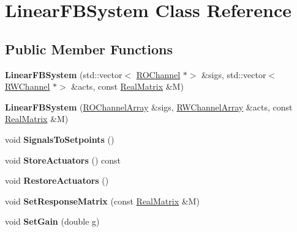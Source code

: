 \hypertarget{classLinearFBSystem}{}\section{Linear\+F\+B\+System Class Reference}
\label{classLinearFBSystem}
\subsection*{Public Member Functions}
\begin{DoxyCompactItemize}
\item 
\mbox{\label{classLinearFBSystem_a61e823fce2a88857f47ac68df6d3d3f1}} 
{\bfseries Linear\+F\+B\+System} (std\+::vector$<$ \hyperlink{classROChannel}{R\+O\+Channel} $\ast$$>$ \&sigs, std\+::vector$<$ \hyperlink{classRWChannel}{R\+W\+Channel} $\ast$$>$ \&acts, const \hyperlink{classTLAS_1_1Matrix}{Real\+Matrix} \&M)
\item 
\mbox{\label{classLinearFBSystem_aea0fb2b61de072efb6f20ce692f8115a}} 
{\bfseries Linear\+F\+B\+System} (\hyperlink{classROChannelArray}{R\+O\+Channel\+Array} \&sigs, \hyperlink{classRWChannelArray}{R\+W\+Channel\+Array} \&acts, const \hyperlink{classTLAS_1_1Matrix}{Real\+Matrix} \&M)
\item 
\mbox{\label{classLinearFBSystem_acb3b2e6a880de066f4ee37156e20447f}} 
void {\bfseries Signals\+To\+Setpoints} ()
\item 
\mbox{\label{classLinearFBSystem_ac9a6be5d7594c52d625ba764a265460a}} 
void {\bfseries Store\+Actuators} () const
\item 
\mbox{\label{classLinearFBSystem_a5eed47c6292fc1c4e8fb955da32b4aa9}} 
void {\bfseries Restore\+Actuators} ()
\item 
\mbox{\label{classLinearFBSystem_adb6b1fdf6cb4542d3030c21d1d48fd5d}} 
void {\bfseries Set\+Response\+Matrix} (const \hyperlink{classTLAS_1_1Matrix}{Real\+Matrix} \&M)
\item 
\mbox{\label{classLinearFBSystem_a6b210631d2f0be9e074f43bb5aa765a4}} 
void {\bfseries Set\+Gain} (double g)
\item 

\end{DoxyCompactItemize}
